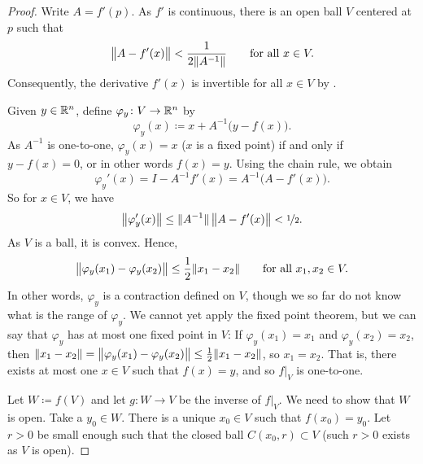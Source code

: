 \begin{proof}
Write $A = f'(p)$.  As $f'$ is continuous, there is an open ball
$V$ centered at $p$ such that
\begin{equation*}
\bigl\lVert {A-f'(x)} \bigr\rVert < \frac{1}{2\lVert {A^{-1}} \rVert}
\qquad \text{for all } x \in V.
\end{equation*}
Consequently, the derivative $f'(x)$ is invertible for all $x \in V$
by .

Given $y \in {\mathbb{R}}^n$, define $\varphi_y \colon V \to {\mathbb{R}}^n$ by
\begin{equation*}
\varphi_y (x) \coloneqq x + A^{-1}\bigl(y-f(x)\bigr) .
\end{equation*}
As $A^{-1}$ is one-to-one,
$\varphi_y(x) = x$ ($x$ is a fixed point) if and only if
$y-f(x) = 0$, or in other words $f(x)=y$.  Using the chain rule, we obtain
\begin{equation*}
\varphi_y'(x) = I - A^{-1} f'(x) = A^{-1} \bigl( A-f'(x) \bigr) .
\end{equation*}
So for $x \in V$, we have
\begin{equation*}
\bigl\lVert {\varphi_y'(x)} \bigr\rVert \leq \lVert {A^{-1}} \rVert \, \bigl\lVert {A-f'(x)} \bigr\rVert < \nicefrac{1}{2} .
\end{equation*}
As $V$ is a ball, it is convex.  Hence,
\begin{equation*}
\bigl\lVert {\varphi_y(x_1)-\varphi_y(x_2)} \bigr\rVert \leq \frac{1}{2} \lVert {x_1-x_2} \rVert 
\qquad
\text{for all } x_1,x_2 \in V.
\end{equation*}
In other words, $\varphi_y$ is a contraction defined on $V$, though we so far
do not know what is the range of $\varphi_y$.  We cannot yet
apply the fixed
point theorem, but we can say that $\varphi_y$ 
has at most one fixed point in $V$:
If $\varphi_y(x_1) = x_1$ and
$\varphi_y(x_2) = x_2$, then
$\lVert {x_1-x_2} \rVert = \bigl\lVert {\varphi_y(x_1)-\varphi_y(x_2)} \bigr\rVert \leq
\frac{1}{2} \lVert {x_1-x_2} \rVert$, so $x_1 = x_2$.
That is, there exists at most one $x \in V$
such that $f(x) = y$, and so $f|_V$ is one-to-one.

Let $W \coloneqq f(V)$ and let $g \colon W \to V$ be the inverse of $f|_V$.
We need to show that $W$ is open.  Take a $y_0 \in W$.
There is a unique $x_0 \in V$ such that $f(x_0) = y_0$.
Let $r > 0$ be small enough such that the closed ball $C(x_0,r) \subset V$
(such $r > 0$ exists as $V$ is open).


\end{proof}
